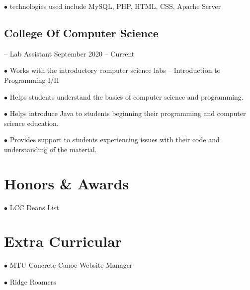 \documentclass[12pt]{article}
\begin{document}
$\bullet$ technologies used include MySQL, PHP, HTML, CSS, Apache Server




\subsection{College Of Computer Science} \hspace{.4em}-- Lab Assistant \hfill September 2020 -- Current

$\bullet$ Works with the introductory computer science labs -- Introduction to Programming I/II

$\bullet$ Helps students understand the basics of computer science and programming.

$\bullet$ Helps introduce Java to students beginning their programming and computer science education.

$\bullet$ Provides support to students experiencing issues with their code and understanding of the material.


%
%
%



\section{Honors \& Awards}

$\bullet$ LCC Deans List \hfill


\section{Extra Curricular}

$\bullet$ MTU Concrete Canoe Website Manager

$\bullet$ Ridge Roamers

\end{document}
